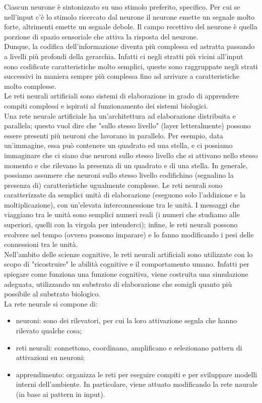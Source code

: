 Ciascun neurone è sintonizzato su uno stimolo preferito, specifico. Per cui se
nell'input c'è lo stimolo ricercato dal neurone il neurone emette un segnale
molto forte, altrimenti emette un segnale debole. Il campo recettivo del neurone
è quella porzione di spazio sensoriale che attiva la risposta del neurone.\\
Dunque, la codifica dell'informazione diventa più complessa ed astratta passando
a livelli più profondi della gerarchia. Infatti ci negli
stratti più vicini all'input sono codificate caratteristiche molto semplici,
queste sono raggruppate negli strati successivi in maniera sempre più complessa
fino ad arrivare a caratteristiche molto complesse.\\
Le reti neurali artificiali sono sistemi di elaborazione in grado di apprendere
compiti complessi e ispirati al funzionamento dei sistemi biologici.\\
Una rete neurale artificiale ha un'architettura ad elaborazione distribuita e
parallela; questo vuol dire che "sullo stesso livello" (layer letteralmente)
possono essere presenti più neuroni che lavorano in parallelo. Per esempio, data
un'immagine, essa può contenere un quadrato ed una stella, e ci possiamo
immaginare che ci siano due neuroni sullo stesso livello che si attivano nello
stesso momento e che rilevano la presenza di un quadrato e di una stella. In
generale, possiamo assumere che neuroni sullo stesso livello codifichino
(segnalino la presenza di) caratteristiche ugualmente complesse. Le reti neurali
sono caratterizzate da semplici unità di elaborazione (eseguono solo l'addizione
e la moltiplicazione), con un'elevata interconnessione tra le unità. I messaggi
che viaggiano tra le unità sono semplici numeri reali (i numeri che studiamo
alle superiori, quelli con la virgola per intenderci); infine, le reti neurali
possono evolvere nel tempo (ovvero possono imparare) e lo fanno modificando i
pesi delle connessioni tra le unità.\\
Nell'ambito delle scienze cognitive, le reti neurali artificiali sono utilizzate
con lo scopo di "ricostruire" le abilità cognitive e il comportamento umano.
Infatti per spiegare come funziona una funzione cognitiva, viene costruita una
simulazione adeguata, utilizzando un substrato di elaborazione che somigli
quanto più possibile al substrato biologico.\\

La rete neurale si compone di:
\begin{itemize}
	\item neuroni: sono dei rilevatori, per cui la loro attivazione segnla che hanno
	rilevato qualche cosa;

	\item reti neurali: connettono, coordinano, amplificano e selezionano
	pattern di attivazioni su neuroni;

	\item apprendimento: organizza le reti per eseguire compiti e per sviluppare
	modelli interni dell'ambiente. In particolare, viene attuato modificando la
	rete naurale (in base ai pattern in input).
\end{itemize}

